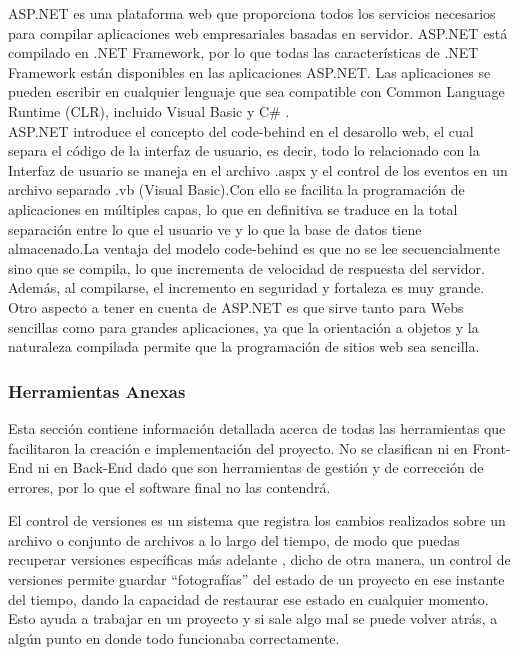  \label{ASP.NET}

ASP.NET es una plataforma web que proporciona todos los servicios necesarios para compilar aplicaciones web empresariales basadas en servidor. ASP.NET está compilado en .NET Framework, por lo que todas las características de .NET Framework están disponibles en las aplicaciones ASP.NET. Las aplicaciones se pueden escribir en cualquier lenguaje que sea compatible con Common Language Runtime (CLR), incluido Visual Basic y C\# \cite{inf15}. 
\\

ASP.NET  introduce el concepto del code-behind en el desarollo web, el cual separa el código de la interfaz de usuario, es decir,  todo lo relacionado con la Interfaz de usuario se maneja en el archivo .aspx y el control de los eventos en un archivo separado .vb (Visual Basic).Con ello se facilita la programación de aplicaciones en múltiples capas, lo que en definitiva se traduce en la total separación entre lo que el usuario ve y lo que la base de datos tiene almacenado.La ventaja del modelo  code-behind  es que no se lee secuencialmente sino que se compila, lo que incrementa de velocidad de respuesta del servidor. Además, al compilarse, el incremento en seguridad y fortaleza es muy grande. 
\\

Otro aspecto a tener en cuenta de ASP.NET es que sirve tanto para Webs sencillas como para grandes aplicaciones, ya que la orientación a objetos y la naturaleza compilada permite que la programación de sitios web sea sencilla.

\subsubsection{Herramientas Anexas}

	Esta sección contiene información detallada acerca de todas las herramientas  que  facilitaron la creación e implementación del proyecto. No se clasifican ni en Front-End ni en Back-End dado que son herramientas de gestión y de corrección de errores, por lo que el software final no las contendrá.
	
	 El control de versiones es un sistema que registra los cambios realizados sobre un archivo o conjunto de archivos a lo largo del tiempo, de modo que puedas recuperar versiones específicas más adelante \cite{gitH15}, dicho de otra manera, un control de versiones permite guardar “fotografías” del estado de un proyecto en ese instante del tiempo, dando la capacidad de restaurar ese estado en cualquier momento. Esto ayuda a trabajar en un proyecto y si sale algo mal se puede volver atrás, a algún punto en donde todo funcionaba correctamente.
	 \\
	 
